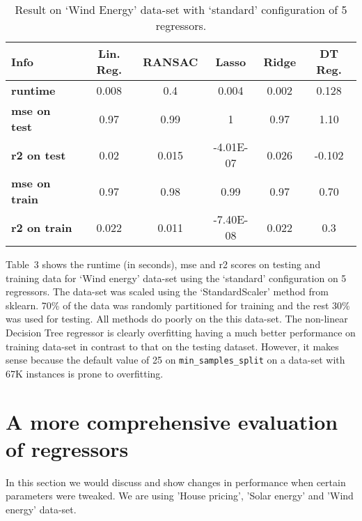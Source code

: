 \documentclass[12pt]{article}
\begin{document}
\begin{table}[!hptb]
\centering
\begin{tabular}{|l|c|c|c|c|c|}
\hline
\textbf{Info} & \textbf{Lin. Reg.} & \textbf{RANSAC} & \textbf{Lasso} & \textbf{Ridge} & \textbf{DT Reg.}  \\\hline
\textbf{runtime} & 0.008 & 0.4 & 0.004 &	0.002 & 0.128 \\
\textbf{mse on test} & 0.97 & 0.99 &	1 & 0.97 & 1.10 \\
\textbf{r2 on test} & 0.02 & 0.015 & -4.01E-07 & 0.026 & -0.102 \\
\textbf{mse on train} & 0.97 & 0.98 & 0.99 &	0.97 & 0.70 \\
\textbf{r2 on train} & 0.022 & 0.011 & -7.40E-08 & 0.022 & 0.3 \\\hline
\end{tabular}
\caption{Result on `Wind Energy' data-set with `standard' configuration of 5 regressors.}
\end{table}

Table~3 shows the runtime (in seconds), mse and r2 scores on testing and training data for `Wind energy' data-set using the `standard' configuration on 5 regressors. The data-set was scaled using the `StandardScaler' method from sklearn. 70\% of the data was randomly partitioned for training and the rest 30\% was used for testing. All methods do poorly on the this data-set.  The non-linear Decision Tree regressor is clearly overfitting having a much better performance on training data-set in contrast to that on the testing dataset. However, it makes sense because the default value of 25 on \texttt{min\_samples\_split} on a data-set with 67K  instances is prone to overfitting.

\section*{A more comprehensive evaluation of regressors}

In this section we would discuss and show changes in performance when certain parameters were tweaked. We are using 'House pricing', 'Solar energy' and 'Wind energy' data-set.
\end{document}
